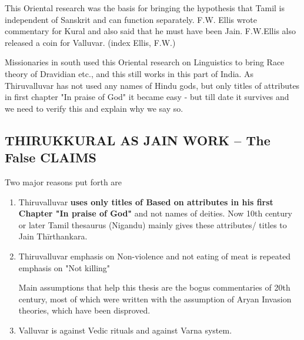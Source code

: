 This Oriental research was the basis for bringing the hypothesis that Tamil is independent of Sanskrit and can function separately. F.W. Ellis wrote commentary for Kural and also said that he must have been Jain. F.W.Ellis also released a coin for Valluvar. (index Ellis, F.W.)

Missionaries in south used this Oriental research on Linguistics to bring Race theory of Dravidian etc., and this still works in this part of India. As Thiruvalluvar has not used any names of Hindu gods, but only titles of attributes in first chapter "In praise of God" it became easy - but till date it survives and we need to verify this and explain why we say so.

\subsection*{THIRUKKURAL AS JAIN WORK – The False CLAIMS}

Two major reasons put forth are

\begin{enumerate}[{\rm 1)}]
\itemsep=0pt
\item Thiruvalluvar \textbf{uses only titles of Based on attributes in his first Chapter "In praise of God"} and not names of deities. Now 10th century or later Tamil thesaurus (Nigandu) mainly gives these attributes/ titles to Jain Thīrthankara.

 \item 
 Thiruvalluvar emphasis on Non-violence and not eating of meat is repeated emphasis on "Not killing"

 Main assumptions that help this thesis are the bogus commentaries of 20th century, most of which were written with the assumption of Aryan Invasion theories, which have been disproved.

 \item Valluvar is against Vedic rituals and against Varna system.

\end{enumerate}


